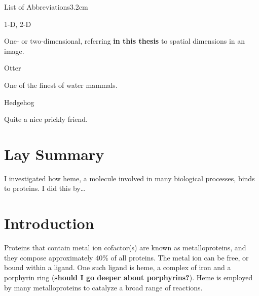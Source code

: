 \documentclass[a4paper, nobind]{templates/ociamthesis}
\begin{document}
\begin{romanpages}
\begin{mclistof}{List of Abbreviations}{3.2cm}
\item[1-D, 2-D]

One- or two-dimensional, referring \textbf{in this thesis} to spatial dimensions in an image.

\item[Otter]

One of the finest of water mammals.

\item[Hedgehog]

Quite a nice prickly friend.

\end{mclistof} 


\end{romanpages}

\flushbottom

\hypertarget{lay-summary}{%
\chapter*{Lay Summary}\label{lay-summary}}

\adjustmtc
{}

I investigated how heme, a molecule involved in many biological processes, binds to proteins. I did this by\ldots{}

\hypertarget{introduction}{%
\chapter*{Introduction}\label{introduction}}

\adjustmtc
{}

Proteins that contain metal ion cofactor(s) are known as metalloproteins, and they compose approximately 40\% of all proteins. The metal ion can be free, or bound within a ligand. One such ligand is heme, a complex of iron and a porphyrin ring (\textbf{should I go deeper about porphyrins?}). Heme is employed by many metalloproteins to catalyze a broad range of reactions.
\end{document}
